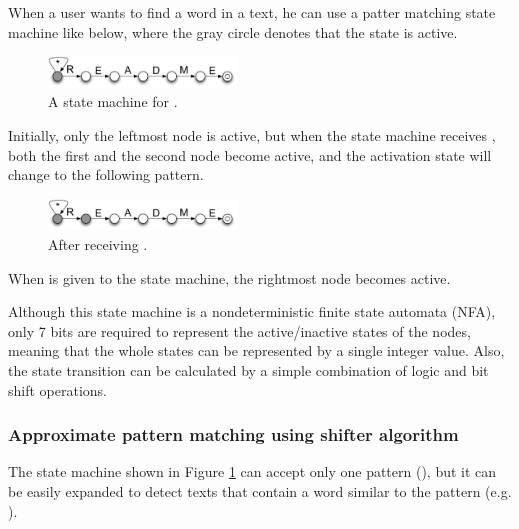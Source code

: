 \documentclass{sigchi}
\begin{document}
When a user wants to find a word  in a text,
he can use a patter matching state machine like below,
where the gray circle denotes that the state is active.

\begin{figure}[h]
  \centerline{\includegraphics[width=50mm,bb=0 0 439 73]{figures/readme1.pdf}}
  \caption{A state machine for .}
  \label{readme1}
\end{figure}

Initially, only the leftmost node is active, but when the
state machine receives , both the first and the second node become active,
and the activation state will change to the following pattern.

\begin{figure}[h]
  \centerline{\includegraphics[width=50mm,bb=0 0 439 73]{figures/readme2.pdf}}
  \caption{After receiving .}
  \label{readme2}
\end{figure}

When  is given to the state machine,
the rightmost node becomes active.
%

Although this state machine is a nondeterministic finite state automata (NFA),
only 7 bits are required to represent the active/inactive states of the nodes,
meaning that the whole states can be represented by a single integer value.
Also,
the state transition can be calculated by a simple combination of
logic and bit shift operations.

\subsubsection{Approximate pattern matching using shifter algorithm}

The state machine shown in Figure \ref{readme1} can accept only one pattern
(), but
it can be easily expanded to detect texts that contain a word
similar to the pattern (e.g. ).

\end{document}
